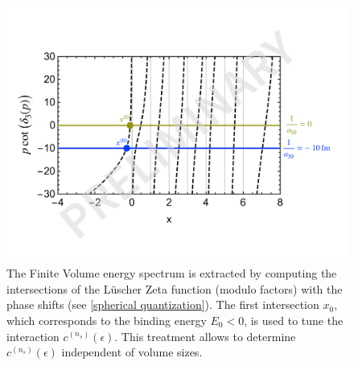 \begin{figure}
\center
\includegraphics[width=.7\textwidth]{figure/tuning.pdf}
\caption{\label{fig:tuning}
    The Finite Volume energy spectrum is extracted by computing the intersections of the Lüscher Zeta function (modulo factors) with the phase shifts (see \eqref{spherical quantization}).
    The first intersection $x_0$, which corresponds to the binding energy $E_0 < 0$, is used to tune the interaction $c^{(n_s)}(\epsilon)$.
    This treatment allows to determine $c^{(n_s)}(\epsilon)$ independent of volume sizes.
}
\end{figure}




